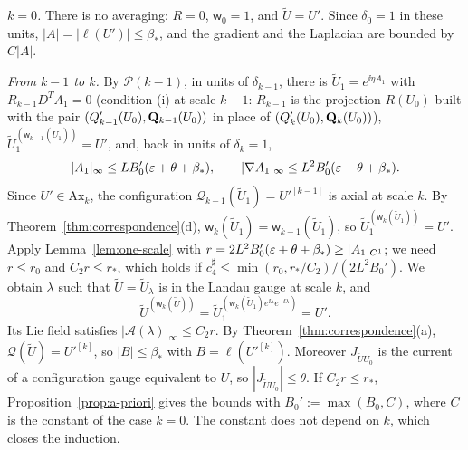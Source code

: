 \emph{$k=0$.} There is no averaging: $R=0$, $\mathsf w_0=1$, and $\tilde U=U'$. Since $\delta_0=1$ in these units, $|A|=|\ell(U')|\le\beta_*$, and the gradient and the Laplacian are bounded by $C|A|$.

\emph{From $k-1$ to $k$.} By $\mathcal P(k-1)$, in units of $\delta_{k-1}$, there is $\tilde U_1=e^{\ii\eta A_1}$ with $R_{k-1}D^TA_1=0$ (condition (i) at scale $k-1$: $R_{k-1}$ is the projection $R(U_0)$ built with the pair $(Q'_{k-1}(U_0),\mathbf Q_{k-1}(U_0))$ in place of $(Q'_k(U_0),\mathbf Q_k(U_0))$), $\tilde U_1^{(\mathsf w_{k-1}(\tilde U_1))}=U'$, and, back in units of $\delta_k=1$,
\[
|A_1|_\infty\le LB_0'(\varepsilon+\theta+\beta_*),\qquad|\nabla A_1|_\infty\le L^2B_0'(\varepsilon+\theta+\beta_*).
\]
Since $U'\in\mathrm{Ax}_k$, the configuration $\mathcal Q_{k-1}(\tilde U_1)=U'^{[k-1]}$ is axial at scale $k$. By Theorem~\ref{thm:correspondence}(d), $\mathsf w_k(\tilde U_1)=\mathsf w_{k-1}(\tilde U_1)$, so $\tilde U_1^{(\mathsf w_k(\tilde U_1))}=U'$. Apply Lemma~\ref{lem:one-scale} with $r=2L^2B_0'(\varepsilon+\theta+\beta_*)\ge|A_1|_{C^1}$; we need $r\le r_0$ and $C_2r\le r_*$, which holds if $c_4^\sharp\le\min(r_0,r_*/C_2)/(2L^2B_0')$. We obtain $\lambda$ such that $\tilde U=\tilde U_\lambda$ is in the Landau gauge at scale $k$, and
\[
\tilde U^{(\mathsf w_k(\tilde U))}=\tilde U_1^{(\mathsf w_k(\tilde U_1)e^{\ii\lambda}e^{-\ii\lambda})}=U' .
\]
Its Lie field satisfies $|\mathcal A(\lambda)|_\infty\le C_2r$. By Theorem~\ref{thm:correspondence}(a), $\mathcal Q(\tilde U)=U'^{[k]}$, so $|B|\le\beta_*$ with $B=\ell(U'^{[k]})$. Moreover $J_{\tilde UU_0}$ is the current of a configuration gauge equivalent to $U$, so $|J_{\tilde UU_0}|\le\theta$. If $C_2r\le r_*$, Proposition~\ref{prop:a-priori} gives the bounds with $B_0':=\max(B_0,C)$, where $C$ is the constant of the case $k=0$. The constant does not depend on $k$, which closes the induction.


